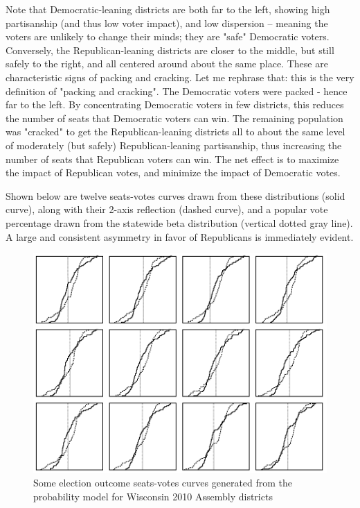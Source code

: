 \documentclass[preprint,12pt]{article}
\begin{document}
Note that Democratic-leaning districts are both far to the left, showing high partisanship (and thus low voter impact), and low dispersion -- meaning the voters are unlikely to change their minds; they are "safe" Democratic voters.  Conversely, the Republican-leaning districts are closer to the middle, but still safely to the right, and all centered around about the same place.   These are characteristic signs of packing and cracking.  Let me rephrase that: this is the very definition of "packing and cracking".  The Democratic voters were packed - hence far to the left.  By concentrating Democratic voters in few districts, this reduces the number of seats that Democratic voters can win.  The remaining population was "cracked" to get the Republican-leaning districts all to about the same level of moderately (but safely) Republican-leaning partisanship, thus increasing the number of seats that Republican voters can win.  The net effect is to maximize the impact of Republican votes, and minimize the impact of Democratic votes.
 
Shown below are twelve seats-votes curves drawn from these distributions (solid curve), along with their 2-axis reflection (dashed curve), and a popular vote percentage drawn from the statewide beta distribution (vertical dotted gray line).  A large and consistent asymmetry in favor of Republicans is immediately evident.

\begin{figure}[htb!]
    \begin{center}
        \includegraphics[scale=0.6]{../Figures/WI2010/sv_curves_assembly.png}
        \caption{Some election outcome seats-votes curves generated from the probability model for Wisconsin 2010 Assembly districts}\label{fig:SVAssembly}
    \end{center}
\end{figure}
\end{document}
